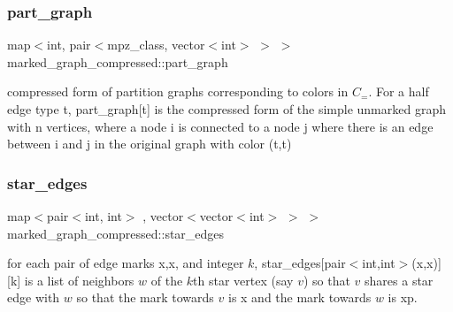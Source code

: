 \mbox{\label{classmarked__graph__compressed_ae179a4737e6eab905c18a94d44ef64b7}} 
\subsubsection{\texorpdfstring{part\+\_\+graph}{part\_graph}}
{\footnotesize\ttfamily map$<$int, pair$<$mpz\+\_\+class, vector$<$int$>$ $>$ $>$ marked\+\_\+graph\+\_\+compressed\+::part\+\_\+graph}



compressed form of partition graphs corresponding to colors in $C_=$. For a half edge type t, part\+\_\+graph\mbox{[}t\mbox{]} is the compressed form of the simple unmarked graph with n vertices, where a node i is connected to a node j where there is an edge between i and j in the original graph with color (t,t) 

\mbox{\label{classmarked__graph__compressed_a7df5779d313486644132bd816937f532}} 
\subsubsection{\texorpdfstring{star\+\_\+edges}{star\_edges}}
{\footnotesize\ttfamily map$<$pair$<$int, int$>$ , vector$<$vector$<$int$>$ $>$ $>$ marked\+\_\+graph\+\_\+compressed\+::star\+\_\+edges}



for each pair of edge marks x,x\textquotesingle{}, and integer $k$, star\+\_\+edges\mbox{[}pair$<$int,int$>$(x,x\textquotesingle{})\mbox{]}\mbox{[}k\mbox{]} is a list of neighbors $w$ of the $k$th star vertex (say $v$) so that $v$ shares a star edge with $w$ so that the mark towards $v$ is x and the mark towards $w$ is xp. 

\mbox{\label{classmarked__graph__compressed_a7a4ced4586e2e353f9076bd447df5208}} 
